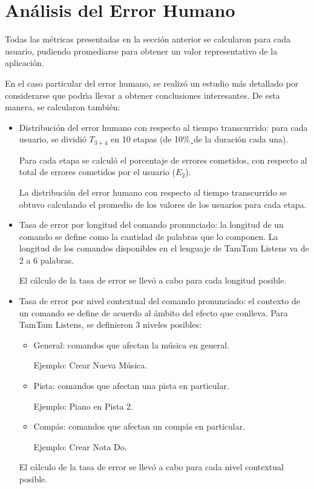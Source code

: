 \section{An\'alisis del Error Humano}
\label{sec:evaluacionError}
Todas las m\'etricas presentadas en la secci\'on anterior se calcularon para cada usuario,
pudiendo promediarse para obtener un valor representativo de la aplicaci\'on.

En el caso particular del error humano, se realiz\'o un estudio m\'as detallado
por considerarse que podr{\'\i}a llevar a obtener conclusiones interesantes. De esta manera,
se calcularon tambi\'en:

\begin{itemize}
	\item Distribuci\'on del error humano con respecto al tiempo transcurrido: para cada usuario, 
	se dividi\'o $T_{3+4}$ en 10 etapas (de 10\%¸de la duraci\'on cada una).

	Para cada etapa se calcul\'o el porcentaje de errores cometidos, con respecto al total de
	errores cometidos por el usuario ($E_2$).

	La distribuci\'on del error humano con respecto al tiempo transcurrido se obtuvo calculando 
	el promedio de los valores de los usuarios para cada etapa.

	\item Tasa de error por longitud del comando pronunciado: la longitud de un comando se define
	como la cantidad de palabras que lo componen. La longitud de los comandos disponibles en el 
	lenguaje de TamTam Listens va de 2 a 6 palabras.

	El c\'alculo de la tasa de error se llev\'o a cabo para cada longitud posible.  


	\item Tasa de error por nivel contextual del comando pronunciado: el contexto de un comando
	se define de acuerdo al \'ambito del efecto que conlleva.
	Para TamTam Listens, se definieron 3 niveles posibles:
		\begin{itemize}
			\item General: comandos que afectan la m\'usica en general. 

			Ejemplo: Crear Nueva M\'usica.
			\item Pista: comandos que afectan una pista en particular. 

			Ejemplo: Piano en Pista 2.
			\item Comp\'as: comandos que afectan un comp\'as en particular. 

			Ejemplo: Crear Nota Do.
		\end{itemize}
		
	El c\'alculo de la tasa de error se llev\'o a cabo para cada nivel contextual posible.  

\end{itemize}